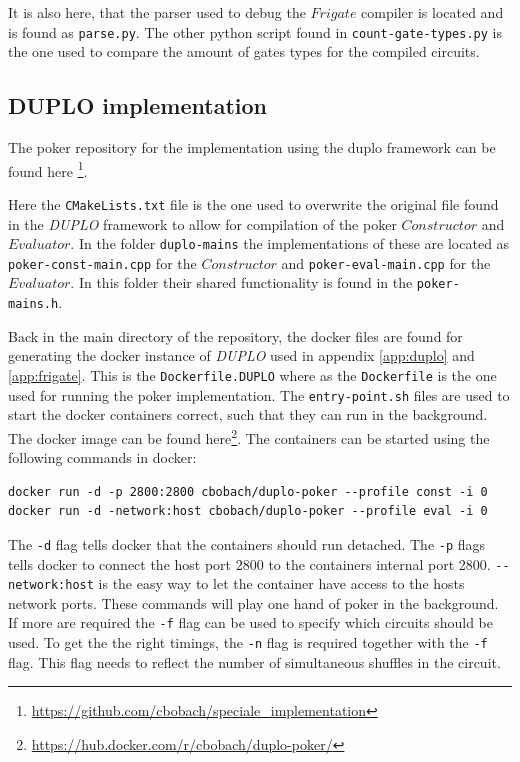 \documentclass[twoside,11pt,openright]{report}
\newcommand{\DUPLO}{\textit{DUPLO} }
\begin{document}
\begin{appendices}
It is also here, that the parser used to debug the $Frigate$ compiler is located and is found as \verb|parse.py|. The other python script found in \verb|count-gate-types.py| is the one used to compare the amount of gates types for the compiled circuits.


\subsection{DUPLO implementation}
\label{app:duplo-impl}
The poker repository for the implementation using the duplo framework can be found here \footnote{\url{https://github.com/cbobach/speciale_implementation}}.

Here the \verb|CMakeLists.txt| file is the one used to overwrite the original file found in the \DUPLO framework to allow for compilation of the poker $Constructor$ and $Evaluator$. In the folder \verb|duplo-mains| the implementations of these are located as \verb|poker-const-main.cpp| for the $Constructor$ and \verb|poker-eval-main.cpp| for the $Evaluator$. In this folder their shared functionality is found in the \verb|poker-mains.h|.

\bigskip

Back in the main directory of the repository, the docker files are found for generating the docker instance of \DUPLO used in appendix \ref{app:duplo} and \ref{app:frigate}. This is the \verb|Dockerfile.DUPLO| where as the \verb|Dockerfile| is the one used for running the poker implementation. The \verb|entry-point.sh| files are used to start the docker containers correct, such that they can run in the background. The docker image can be found here\footnote{\url{https://hub.docker.com/r/cbobach/duplo-poker/}}. The containers can be started using the following commands in docker:

\begin{center}
\begin{verbatim}
docker run -d -p 2800:2800 cbobach/duplo-poker --profile const -i 0
docker run -d -network:host cbobach/duplo-poker --profile eval -i 0
\end{verbatim}
\end{center}

The \verb|-d| flag tells docker that the containers should run detached. The \verb|-p| flags tells docker to connect the host port $2800$ to the containers internal port 2800. \verb|--network:host| is the easy way to let the container have access to the hosts network ports. These commands will play one hand of poker in the background. If more are required the \verb|-f| flag can be used to specify which circuits should be used. To get the the right timings, the \verb|-n| flag is required together with the \verb|-f| flag. This flag needs to reflect the number of simultaneous shuffles in the circuit.


\end{appendices}
\end{document}
